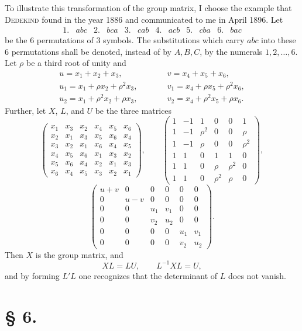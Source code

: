 \documentclass[11pt]{article}
\begin{document}
To illustrate this transformation of the group matrix, I choose the example that \textsc{Dedekind} found in the year 1886 and communicated to me in April 1896. Let
\[
\begin{array}{cccccccccccc}
1.&abc&2.&bca&3.&cab&4.&acb&5.&cba&6.&bac
\end{array}
\]
be the 6 permutations of 3 symbols. The substitutions which carry $abc$ into these 6 permutations shall be denoted, instead of by $A,B,C$, by the numerals $1,2,\ldots,6$. Let $\rho$ be a third root of unity and
\[
\begin{array}{lll}
u=x_1+x_2+x_3, &\qquad& v=x_4+x_5+x_6,\\
u_1=x_1+\rho x_2+\rho^2x_3, && v_1=x_4+\rho x_5+\rho^2x_6,\\
u_2=x_1+\rho^2x_2+\rho x_3, && v_2=x_4+\rho^2x_5+\rho x_6.
\end{array}
\]
Further, let $X$, $L$, and $U$ be the three matrices
\[
\begin{pmatrix}
x_1&x_3&x_2&x_4&x_5&x_6\\
x_2&x_1&x_3&x_5&x_6&x_4\\
x_3&x_2&x_1&x_6&x_4&x_5\\
x_4&x_5&x_6&x_1&x_3&x_2\\
x_5&x_6&x_4&x_2&x_1&x_3\\
x_6&x_4&x_5&x_3&x_2&x_1
\end{pmatrix},
\qquad
\begin{pmatrix}
1&-1&1&0&0&1\\
1&-1&\rho^2&0&0&\rho\\
1&-1&\rho&0&0&\rho^2\\
1&1&0&1&1&0\\
1&1&0&\rho&\rho^2&0\\
1&1&0&\rho^2&\rho&0
\end{pmatrix},
\]
\[
\begin{pmatrix}
u+v&0&0&0&0&0\\
0&u-v&0&0&0&0\\
0&0&u_1&v_1&0&0\\
0&0&v_2&u_2&0&0\\
0&0&0&0&u_1&v_1\\
0&0&0&0&v_2&u_2
\end{pmatrix}.
\]
Then $X$ is the group matrix, and
\[
XL=LU,
\qquad
L^{-1}XL=U,
\]
and by forming $L'L$ one recognizes that the determinant of $L$ does not vanish.

\section*{§ 6.}
\end{document}
